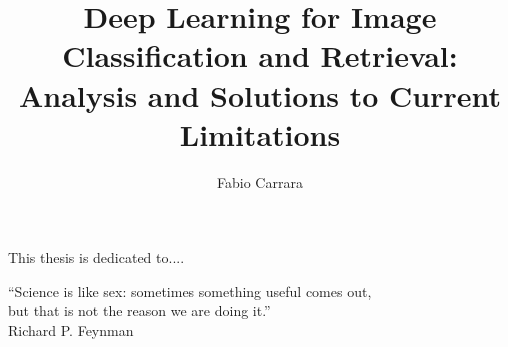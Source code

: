 \documentclass[a4,10pt,twoside,openright,italian,english]{book}%
\author{Fabio Carrara}
\title{Deep Learning for Image Classification and Retrieval: Analysis and Solutions to Current Limitations}
\begin{document}

\maketitle

\pagestyle{empty}

\cleardoublepage
\newpage

\thispagestyle{empty}
    \null{}
        \begin{flushright}
                This thesis is dedicated to....
        \end{flushright}
\null

\cleardoublepage
\newpage

\pagestyle{empty}

\thispagestyle{empty}
    \null{}
        \begin{flushright}
                ``Science is like sex: sometimes something useful comes out,\\
                but that is not the reason we are doing it.''\\
                Richard P. Feynman
        \end{flushright}
\null

\cleardoublepage
\newpage

\pagestyle{empty}
\setcounter{page}{1}





\cleardoublepage
\newpage

\pagestyle{fancy}
\end{document}
